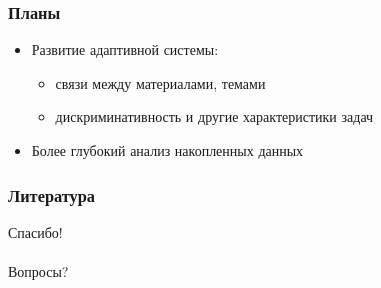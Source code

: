 \documentclass{beamer}
\begin{document}
\begin{frame}\frametitle{Планы}
    \begin{itemize}
        \item Развитие адаптивной системы:
            \begin{itemize}
                \item связи между материалами, темами
                \item дискриминативность и другие характеристики задач
            \end{itemize}
        \bigskip
        \item Более глубокий анализ накопленных данных
    \end{itemize}

\end{frame}



\begin{frame}\frametitle{Литература}
\setmonofont[Mapping=tex-text]{CMU Typewriter Text}

\end{frame}


\begin{frame}
\huge{Спасибо! \\\indent \\\indent Вопросы?}
\end{frame}
\end{document}
